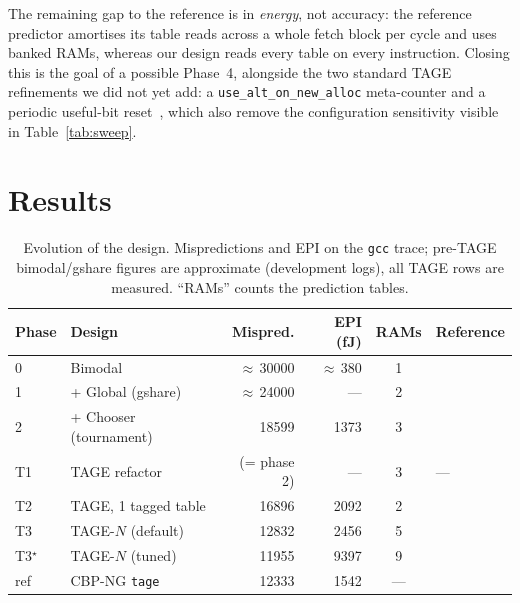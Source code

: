 \documentclass[11pt]{article}
\newcommand{\code}[1]{\texttt{\small #1}}
\begin{document}
The remaining gap to the reference is in \emph{energy}, not accuracy: the
reference predictor amortises its table reads across a whole fetch block per
cycle and uses banked RAMs, whereas our design reads every table on every
instruction. Closing this is the goal of a possible Phase~4, alongside the two
standard TAGE refinements we did not yet add: a \code{use\_alt\_on\_new\_alloc}
meta-counter and a periodic useful-bit reset~\cite{seznec2006,seznec2016}, which
also remove the configuration sensitivity visible in Table~\ref{tab:sweep}.

\section{Results}

\begin{table}[t]
\centering
\caption{Evolution of the design. Mispredictions and EPI on the \code{gcc}
trace; pre-TAGE bimodal/gshare figures are approximate (development logs), all
TAGE rows are measured. ``RAMs'' counts the prediction tables.}
\label{tab:evolution}
\small
\begin{tabular}{llrrcl}
\toprule
Phase & Design & Mispred. & EPI (fJ) & RAMs & Reference \\
\midrule
0   & Bimodal                 & $\approx$\,30000 & $\approx$\,380 & 1 & \cite{smith1981} \\
1   & + Global (gshare)       & $\approx$\,24000 & ---            & 2 & \cite{mcfarling1993,yehpatt1992} \\
2   & + Chooser (tournament)  & \num{18599}      & \num{1373}     & 3 & \cite{mcfarling1993} \\
\addlinespace
T1  & TAGE refactor           & (= phase 2)      & ---            & 3 & --- \\
T2  & TAGE, 1 tagged table    & \num{16896}      & \num{2092}     & 2 & \cite{michaud2005,seznec2006} \\
T3  & TAGE-$N$ (default)       & \num{12832}      & \num{2456}     & 5 & \cite{seznec2005,seznec2006} \\
T3$^\star$ & TAGE-$N$ (tuned)  & \num{11955}      & \num{9397}     & 9 & \cite{seznec2006} \\
\midrule
ref & CBP-NG \code{tage}      & \num{12333}      & \num{1542}     & --- & \cite{seznec2016} \\
\bottomrule
\end{tabular}
\end{table}
\end{document}
